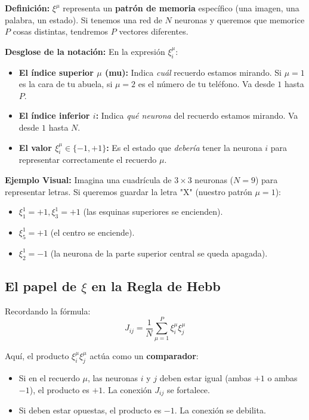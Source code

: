 \noindent
\textbf{Definición:} $\xi^\mu$ representa un \textbf{patrón de memoria} específico (una imagen, una palabra, un estado). Si tenemos una red de $N$ neuronas y queremos que memorice $P$ cosas distintas, tendremos $P$ vectores diferentes.

\textbf{Desglose de la notación:}
En la expresión $\xi_i^\mu$:
\begin{itemize}
    \item \textbf{El índice superior $\mu$ (mu):} Indica \textit{cuál} recuerdo estamos mirando. Si $\mu=1$ es la cara de tu abuela, si $\mu=2$ es el número de tu teléfono. Va desde $1$ hasta $P$.
    \item \textbf{El índice inferior $i$:} Indica \textit{qué neurona} del recuerdo estamos mirando. Va desde $1$ hasta $N$.
    \item \textbf{El valor $\xi_i^\mu \in \{-1, +1\}$:} Es el estado que \textit{debería} tener la neurona $i$ para representar correctamente el recuerdo $\mu$.
\end{itemize}

\textbf{Ejemplo Visual:}
Imagina una cuadrícula de $3 \times 3$ neuronas ($N=9$) para representar letras. Si queremos guardar la letra "X" (nuestro patrón $\mu=1$):
\begin{itemize}
    \item $\xi_1^1 = +1, \xi_3^1 = +1$ (las esquinas superiores se encienden).
    \item $\xi_5^1 = +1$ (el centro se enciende).
    \item $\xi_2^1 = -1$ (la neurona de la parte superior central se queda apagada).
\end{itemize}



\subsection{El papel de $\xi$ en la Regla de Hebb}

Recordando la fórmula:
\begin{equation}
    J_{ij} = \frac{1}{N} \sum_{\mu=1}^{P} \xi_i^\mu \xi_j^\mu
\end{equation}

Aquí, el producto $\xi_i^\mu \xi_j^\mu$ actúa como un \textbf{comparador}:
\begin{itemize}
    \item Si en el recuerdo $\mu$, las neuronas $i$ y $j$ deben estar igual (ambas $+1$ o ambas $-1$), el producto es $+1$. La conexión $J_{ij}$ se fortalece.
    \item Si deben estar opuestas, el producto es $-1$. La conexión se debilita.
\end{itemize}

